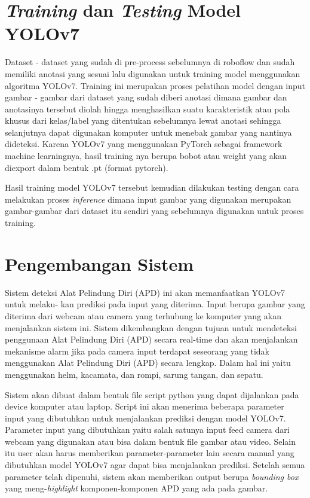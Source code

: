 \section{\emph{Training} dan \emph{Testing} Model YOLOv7}
\label{sec:trainingdataset}

\par Dataset - dataset yang sudah di pre-process sebelumnya di roboflow dan sudah memiliki anotasi yang sesuai lalu digunakan untuk training model menggunakan algoritma YOLOv7. Training ini merupakan proses pelatihan model dengan input gambar - gambar dari dataset yang sudah diberi anotasi dimana gambar dan anotasinya tersebut diolah hingga menghasilkan suatu karakteristik atau pola khusus dari kelas/label yang ditentukan sebelumnya lewat anotasi sehingga selanjutnya dapat digunakan komputer untuk menebak gambar yang nantinya dideteksi. Karena YOLOv7 yang menggunakan PyTorch sebagai framework machine learningnya, hasil training nya berupa bobot atau weight yang akan diexport dalam bentuk .pt (format pytorch).

\par Hasil training model YOLOv7 tersebut kemudian dilakukan testing dengan cara melakukan proses \textit{inference} dimana input gambar yang digunakan merupakan gambar-gambar dari dataset itu sendiri yang sebelumnya digunakan untuk proses training.

\section{Pengembangan Sistem}
\label{sec:pengembangansistem}

Sistem deteksi Alat Pelindung Diri (APD) ini akan memanfaatkan YOLOv7 untuk melaku- kan prediksi pada input yang diterima. Input berupa gambar yang diterima dari
webcam atau camera yang terhubung ke komputer yang akan menjalankan sistem ini.
Sistem dikembangkan dengan tujuan untuk mendeteksi penggunaan Alat Pelindung Diri (APD) secara real-time dan akan menjalankan mekanisme alarm jika pada camera input
terdapat seseorang yang tidak menggunakan Alat Pelindung Diri (APD) secara lengkap. Dalam hal ini yaitu menggunakan helm, kacamata, dan rompi, sarung tangan, dan sepatu.

Sistem akan dibuat dalam bentuk file script python yang dapat dijalankan pada device komputer atau laptop. Script ini akan menerima beberapa parameter input yang dibutuhkan untuk menjalankan prediksi dengan model YOLOv7. Parameter input yang dibutuhkan yaitu salah satunya input feed camera dari webcam yang digunakan atau bisa dalam bentuk file gambar atau video.
Selain itu user akan harus memberikan parameter-parameter lain secara manual yang dibutuhkan model YOLOv7 agar dapat bisa menjalankan prediksi. Setelah semua parameter telah dipenuhi, sistem akan memberikan output berupa \textit{bounding box} yang meng-\textit{highlight} komponen-komponen APD yang ada pada gambar.

